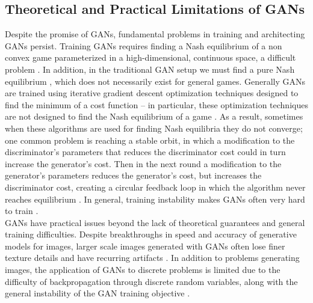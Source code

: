 \documentclass{article}
\begin{document}
\subsection{Theoretical and Practical Limitations of GANs}
Despite the promise of GANs, fundamental problems in training and architecting GANs persist. Training GANs requires finding a Nash equilibrium of a non convex game parameterized in a high-dimensional, continuous space, a difficult problem \citep{Goodfellow17} \citep{Salimans2016}. In addition, in the traditional GAN setup we must find a pure Nash equilibrium \citep{Arora17}, which does not necessarily exist for general games. Generally GANs are trained using iterative gradient descent optimization techniques designed to find the minimum of a cost function – in particular, these optimization techniques are not designed to find the Nash equilibrium of a game \citep{Salimans2016}. As a result, sometimes when these algorithms are used for finding Nash equilibria they do not converge; one common problem is reaching a stable orbit, in which a modification to the discriminator's parameters that reduces the discriminator cost could in turn increase the generator’s cost. Then in the next round a modification to the generator’s parameters reduces the generator’s cost, but increases the discriminator cost, creating a circular feedback loop in which the algorithm never reaches equilibrium \citep{Salimans2016}. In general, training instability makes GANs often very hard to train \citep{DBLP:journals/corr/GulrajaniAADC17}.
\\
GANs have practical issues beyond the lack of theoretical guarantees and general training difficulties. Despite breakthroughs in speed and accuracy of generative models for images, larger scale images generated with GANs often lose finer texture details and have recurring artifacts \citep{DBLP:journals/corr/LedigTHCATTWS16} \citep{Salimans2016} \citep{DBLP:journals/corr/ShrivastavaPTSW16}. In addition to problems generating images, the application of GANs to discrete problems is limited due to the difficulty of backpropagation through discrete random variables, along with the general instability of the GAN training objective \citep{Che+al-2017-augmented}. 
\end{document}
